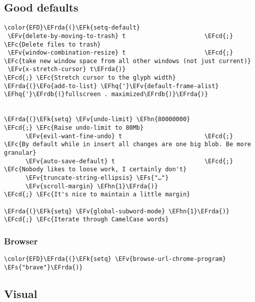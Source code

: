 \documentclass[12pt]{article}
\theoremstyle{plain}%
\theoremstyle{definition}
\theoremstyle{remark}
\newcommand{\EFc}[1]{\textcolor{EFc}{#1}} %
\newcommand{\EFcd}[1]{\textcolor{EFcd}{#1}} %
\newcommand{\EFs}[1]{\textcolor{EFs}{#1}} %
\newcommand{\EFk}[1]{\textcolor{EFk}{#1}} %
\newcommand{\EFv}[1]{\textcolor{EFv}{#1}} %
\newcommand{\EFo}[1]{\textcolor{EFo}{#1}} %
\newcommand{\EFhn}[1]{\textcolor{EFhn}{\textbf{#1}}} %
\newcommand{\EFhq}[1]{\textcolor{EFhq}{#1}} %
\newcommand{\EFrda}[1]{\textcolor{EFrda}{#1}} %
\newcommand{\EFrdb}[1]{\textcolor{EFrdb}{#1}} %
\begin{document}
\subsection{Good defaults}
\label{sec:orgfa4c704}
\begin{Code}
\begin{Verbatim}
\color{EFD}\EFrda{(}\EFk{setq-default}
 \EFv{delete-by-moving-to-trash} t                      \EFcd{;} \EFc{Delete files to trash}
 \EFv{window-combination-resize} t                      \EFcd{;} \EFc{take new window space from all other windows (not just current)}
 \EFv{x-stretch-cursor} t\EFrda{)}                              \EFcd{;} \EFc{Stretch cursor to the glyph width}
\EFrda{(}\EFo{add-to-list} \EFhq{'}\EFv{default-frame-alist} \EFhq{'}\EFrdb{(}fullscreen . maximized\EFrdb{)}\EFrda{)}


\EFrda{(}\EFk{setq} \EFv{undo-limit} \EFhn{80000000}                         \EFcd{;} \EFc{Raise undo-limit to 80Mb}
      \EFv{evil-want-fine-undo} t                       \EFcd{;} \EFc{By default while in insert all changes are one big blob. Be more granular}
      \EFv{auto-save-default} t                         \EFcd{;} \EFc{Nobody likes to loose work, I certainly don't}
      \EFv{truncate-string-ellipsis} \EFs{"…"}
      \EFv{scroll-margin} \EFhn{1}\EFrda{)}                            \EFcd{;} \EFc{It's nice to maintain a little margin}

\EFrda{(}\EFk{setq} \EFv{global-subword-mode} \EFhn{1}\EFrda{)}                           \EFcd{;} \EFc{Iterate through CamelCase words}
\end{Verbatim}
\end{Code}
\subsubsection{Browser}
\label{sec:org3dcd24d}
\begin{Code}
\begin{Verbatim}
\color{EFD}\EFrda{(}\EFk{setq} \EFv{browse-url-chrome-program} \EFs{"brave"}\EFrda{)}
\end{Verbatim}
\end{Code}
\subsection{Visual}
\label{sec:orgf1f5e94}
\end{document}
